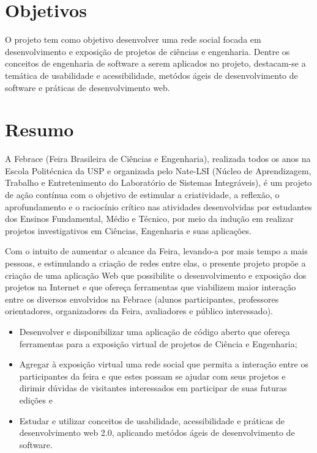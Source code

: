 \documentclass[a4paper,12pt,font=plain,header=plain]{abnt}
\begin{document}
  \setcounter{secnumdepth}{-1}
  \capa

  \renewenvironment{center}{}{}
  \section{Objetivos}
    O projeto tem como objetivo desenvolver uma rede social focada em desenvolvimento e exposição de projetos de ciências e engenharia. Dentre os conceitos de engenharia de software a serem aplicados no projeto, destacam-se a temática de usabilidade e acessibilidade, metódos ágeis de desenvolvimento de software e práticas de desenvolvimento web.

  \section{Resumo}

    A Febrace (Feira Brasileira de Ciências e Engenharia), realizada todos os
    anos na Escola Politécnica da USP e organizada pelo Nate-LSI (Núcleo de
    Aprendizagem, Trabalho e Entretenimento do Laboratório de Sistemas
    Integráveis), é um projeto de ação contínua com o objetivo de estimular a
    criatividade, a reflexão, o aprofundamento e o raciocínio crítico nas
    atividades desenvolvidas por estudantes dos Ensinos Fundamental, Médio e
    Técnico, por meio da indução em realizar projetos investigativos em
    Ciências, Engenharia e suas aplicações.

    Com o intuito de aumentar o alcance da Feira, levando-a por mais tempo a
    mais pessoas, e estimulando a criação de redes entre elas, o presente
    projeto propõe a criação de uma aplicação Web que possibilite o
    desenvolvimento e exposição dos projetos na Internet e que ofereça
    ferramentas que viabilizem maior interação entre os diversos envolvidos na
    Febrace (alunos participantes, professores orientadores, organizadores da
    Feira, avaliadores e público interessado).

    \begin{itemize}
      \item{
        Desenvolver e disponibilizar uma aplicação de código aberto que ofereça ferramentas para a exposição virtual de projetos de Ciência e Engenharia;
      }
      \item{
        Agregar à exposição virtual uma rede social que permita a interação entre os participantes da feira e que estes possam se ajudar com seus projetos e dirimir dúvidas de visitantes interessados em participar de suas futuras edições e
      }
      \item{
        Estudar e utilizar conceitos de usabilidade, acessibilidade e práticas de desenvolvimento web 2.0, aplicando metódos ágeis de desenvolvimento de software.
      }
    \end{itemize}
\end{document}
